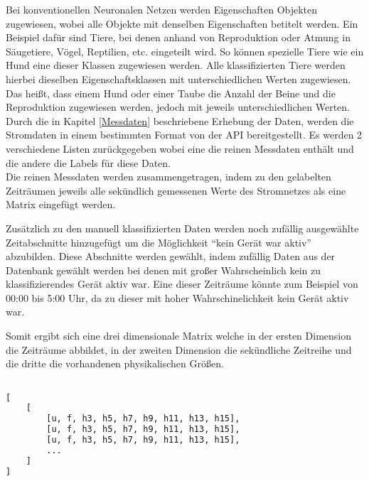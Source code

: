     \noindent
    Bei konventionellen Neuronalen Netzen werden Eigenschaften Objekten zugewiesen, wobei alle Objekte mit denselben Eigenschaften betitelt werden.
    Ein Beispiel dafür sind Tiere, bei denen anhand von Reproduktion oder Atmung in Säugetiere, Vögel, Reptilien, etc. eingeteilt wird. 
    So können spezielle Tiere wie ein Hund eine dieser Klassen zugewiesen werden.
    Alle klassifizierten Tiere werden hierbei dieselben Eigenschaftsklassen mit unterschiedlichen Werten zugewiesen.
    Das heißt, dass einem Hund oder einer Taube die Anzahl der Beine und die Reproduktion zugewiesen werden, jedoch mit jeweils unterschiedlichen Werten.\\
    
    Durch die in Kapitel \ref{Messdaten} beschriebene Erhebung der Daten, werden die Stromdaten in einem bestimmten Format von der API bereitgestellt.
    Es werden 2 verschiedene Listen zurückgegeben wobei eine die reinen Messdaten enthält und die andere die Labels für diese Daten.\\
    Die reinen Messdaten werden zusammengetragen, indem zu den gelabelten Zeiträumen jeweils alle sekündlich gemessenen Werte des Stromnetzes als eine Matrix eingefügt werden.
    \newline

    \noindent
    Zusätzlich zu den manuell klassifizierten Daten werden noch zufällig ausgewählte Zeitabschnitte hinzugefügt um die Möglichkeit "`kein Gerät war aktiv"' abzubilden.
    Diese Abschnitte werden gewählt, indem zufällig Daten aus der Datenbank gewählt werden bei denen mit großer Wahrscheinlich kein zu klassifizierendes Gerät aktiv war.
    Eine dieser Zeiträume könnte zum Beispiel von 00:00 bis 5:00 Uhr, da zu dieser mit hoher Wahrschinelichkeit kein Gerät aktiv war.
    \newline

    \noindent
    Somit ergibt sich eine drei dimensionale Matrix welche in der ersten Dimension die Zeiträume abbildet, in der zweiten Dimension die sekündliche Zeitreihe und die dritte die vorhandenen physikalischen Größen.

    \begin{lstlisting}[language=Python, caption={Datenstruktur der gelabelten Messdaten, die von der API bereit gestellt wird},label=lst:DatenstrukturGelabelteMessdaten]

[
    [
        [u, f, h3, h5, h7, h9, h11, h13, h15],
        [u, f, h3, h5, h7, h9, h11, h13, h15],
        [u, f, h3, h5, h7, h9, h11, h13, h15],
        ...
    ]
]
    \end{lstlisting}

